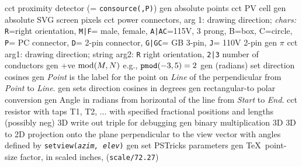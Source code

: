   {cct}
  {proximity detector (= {\tt consource(,P)})}
  {gen}
  {absolute points}
  {cct}
  {PV cell}
  {gen}
  {absolute SVG screen pixels}
  {cct}
  {power connectors, arg 1: drawing direction; {\sl chars:}
   {\tt R}=right orientation, {\tt M|F}= male, female, {\tt A|AC}=115V,
   3 prong, B=box, C=circle, {\tt P}= PC connector, {\tt D}= 2-pin
   connector, {\tt G|GC}= GB 3-pin, {\tt J}= 110V 2-pin
    }
  {gen}
  {$\pi$}
  {cct}
  {arg1: drawing direction; string arg2: {\tt R} right orientation,
   {\tt 2|3} number of conductors }
  {gen}
  {+ve $\hbox{mod}(M,N)$ e.g., $\hbox{\tt pmod}(-3,5)=2$}
  {gen}
  {(radians) set direction cosines}
  {gen}
  {{\sl Point} is the label for the point on {\sl Line} of the
  perpendicular
   from {\sl Point} to {\sl Line}.}
  {gen}
  {sets direction cosines in degrees }
  {gen}
  {rectangular-to polar conversion}
  {gen}
  {Angle in radians from horizontal of the line from {\sl Start}
  to {\sl End}.}
 {cct}
  {resistor with taps T1, T2, $\ldots$
    with specified fractional positions and lengths (possibly neg)
   }
  {3D} {write out triple for debugging}
  {gen}
  {binary multiplication}
  {3D} {3D to 2D projection onto the plane perpendicular to the view
  vector with
   angles defined by {\tt setview({\sl azim, elev})}}
  {gen}
  {set PSTricks parameters}
  {gen}
  {\TeX\ point-size factor, in scaled inches, ({\tt *scale/72.27})}
